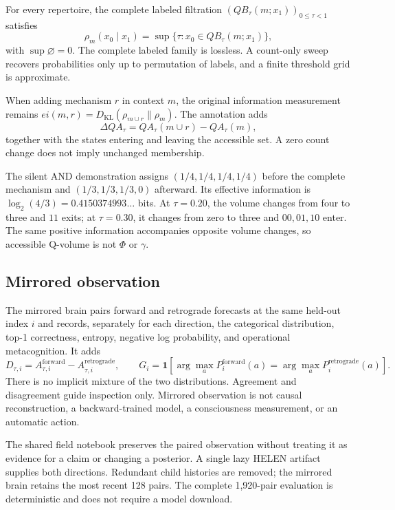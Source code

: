 \documentclass[11pt,a4paper]{article}
\begin{document}
For every repertoire, the complete labeled filtration $(QB_\tau(m;x_1))_{0\leq\tau<1}$ satisfies
\begin{equation}
\rho_m(x_0\mid x_1)=\sup\{\tau:x_0\in QB_\tau(m;x_1)\},
\end{equation}
with $\sup\varnothing=0$. The complete labeled family is lossless. A count-only sweep recovers probabilities only up to permutation of labels, and a finite threshold grid is approximate.

When adding mechanism $r$ in context $m$, the original information measurement remains $ei(m,r)=D_{\mathrm{KL}}(\rho_{m\cup r}\|\rho_m)$. The annotation adds
\begin{equation}
\Delta QA_\tau=QA_\tau(m\cup r)-QA_\tau(m),
\end{equation}
together with the states entering and leaving the accessible set. A zero count change does not imply unchanged membership.

The silent AND demonstration assigns $(1/4,1/4,1/4,1/4)$ before the complete mechanism and $(1/3,1/3,1/3,0)$ afterward. Its effective information is $\log_2(4/3)=0.4150374993\ldots$ bits. At $\tau=0.20$, the volume changes from four to three and $11$ exits; at $\tau=0.30$, it changes from zero to three and $00,01,10$ enter. The same positive information accompanies opposite volume changes, so accessible Q-volume is not $\Phi$ or $\gamma$.

\subsection{Mirrored observation}
The mirrored brain pairs forward and retrograde forecasts at the same held-out index $i$ and records, separately for each direction, the categorical distribution, top-1 correctness, entropy, negative log probability, and operational metacognition. It adds
\begin{equation}
D_{\tau,i}=A_{\tau,i}^{\mathrm{forward}}-A_{\tau,i}^{\mathrm{retrograde}},\qquad
G_i=\mathbf 1[\arg\max_a P^{\mathrm{forward}}_i(a)=\arg\max_a P^{\mathrm{retrograde}}_i(a)].
\end{equation}
There is no implicit mixture of the two distributions. Agreement and disagreement guide inspection only. Mirrored observation is not causal reconstruction, a backward-trained model, a consciousness measurement, or an automatic action.

The shared field notebook preserves the paired observation without treating it as evidence for a claim or changing a posterior. A single lazy HELEN artifact supplies both directions. Redundant child histories are removed; the mirrored brain retains the most recent 128 pairs. The complete 1,920-pair evaluation is deterministic and does not require a model download.
\end{document}
